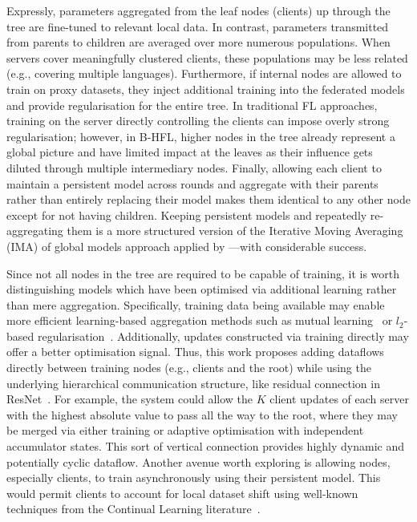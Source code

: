 Expressly, parameters aggregated from the leaf nodes (clients) up through the tree are fine-tuned to relevant local data. In contrast, parameters transmitted from parents to children are averaged over more numerous populations. When servers cover meaningfully clustered clients, these populations may be less related (e.g., covering multiple languages). Furthermore, if internal nodes are allowed to train on proxy datasets, they inject additional training into the federated models and provide regularisation for the entire tree. In traditional FL approaches, training on the server directly controlling the clients can impose overly strong regularisation; however, in B-HFL, higher nodes in the tree already represent a global picture and have limited impact at the leaves as their influence gets diluted through multiple intermediary nodes. Finally, allowing each client to maintain a persistent model across rounds and aggregate with their parents rather than entirely replacing their model makes them identical to any other node except for not having children. Keeping persistent models and repeatedly re-aggregating them is a more structured version of the Iterative Moving Averaging (IMA) of global models approach applied by \citet{UnderstandingModelAveragingInFL}---with considerable success.

Since not all nodes in the tree are required to be capable of training, it is worth distinguishing models which have been optimised via additional learning rather than mere aggregation. Specifically, training data being available may enable more efficient learning-based aggregation methods such as mutual learning~\citep{DeepMutualLearning} or $l_2$-based regularisation~\citep{Ditto}. Additionally, updates constructed via training directly may offer a better optimisation signal. Thus, this work proposes adding dataflows directly between training nodes (e.g., clients and the root) while using the underlying hierarchical communication structure, like residual connection in ResNet~\citep{ResNet}. For example, the system could allow the $K$ client updates of each server with the highest absolute value to pass all the way to the root, where they may be merged via either training or adaptive optimisation with independent accumulator states. This sort of vertical connection provides highly dynamic and potentially cyclic dataflow. Another avenue worth exploring is allowing nodes, especially clients, to train asynchronously using their persistent model. This would permit clients to account for local dataset shift using well-known techniques from the Continual Learning literature~\citep{ContinualLearningSurvey,LearningWithoutForgetting,kirkpatrick2017overcoming}.


